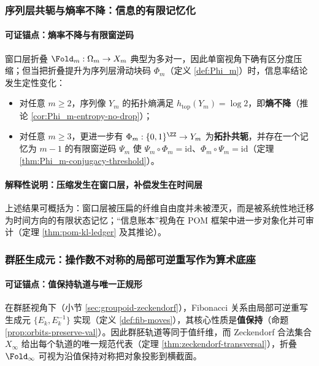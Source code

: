 \subsubsection{序列层共轭与熵率不降：信息的有限记忆化}\label{subsubsec:insight-entropy-memory}
\paragraph{可证锚点：熵率不降与有限窗逆码}
窗口层折叠 \(\Fold_m:\Omega_m\to X_m\) 典型为多对一，因此单窗视角下确有区分度压缩；但当把折叠提升为序列层滑动块码 \(\Phi_m\)（定义 \ref{def:Phi_m}）时，信息率结论发生定性变化：
\begin{itemize}
  \item 对任意 \(m\ge 2\)，序列像 \(Y_m\) 的拓扑熵满足 \(h_{\mathrm{top}}(Y_m)=\log 2\)，即\textbf{熵不降}（推论 \ref{cor:Phi_m-entropy-no-drop}）；
  \item 对任意 \(m\ge 3\)，更进一步有 \(\Phi_m:\{0,1\}^{\ZZ}\to Y_m\) 为\textbf{拓扑共轭}，并存在一个记忆为 \(m-1\) 的有限窗逆码 \(\Psi_m\) 使 \(\Psi_m\circ\Phi_m=\mathrm{id}\)、\(\Phi_m\circ\Psi_m=\mathrm{id}\)（定理 \ref{thm:Phi_m-conjugacy-threshold}）。
\end{itemize}

\paragraph{解释性说明：压缩发生在窗口层，补偿发生在时间层}
上述结果可概括为：窗口层被压扁的纤维自由度并未被湮灭，而是被系统性地迁移为时间方向的有限状态记忆；“信息账本”视角在 POM 框架中进一步对象化并可审计（定理 \ref{thm:pom-kl-ledger} 及其推论）。

\subsubsection{群胚生成元：操作数不对称的局部可逆重写作为算术底座}\label{subsubsec:insight-groupoid-generators}
\paragraph{可证锚点：值保持轨道与唯一正规形}
在群胚视角下（小节 \ref{sec:groupoid-zeckendorf}），Fibonacci 关系由局部可逆重写生成元 \(\{E_k,E_k^{-1}\}\) 实现（定义 \ref{def:fib-moves}），其核心性质是\textbf{值保持}（命题 \ref{prop:orbits-preserve-val}）。因此群胚轨道等同于值纤维，而 Zeckendorf 合法集合 \(X_\infty\) 给出每个轨道的唯一规范代表（定理 \ref{thm:zeckendorf-transversal}），折叠 \(\Fold_\infty\) 可视为沿值保持对称把对象投影到横截面。

